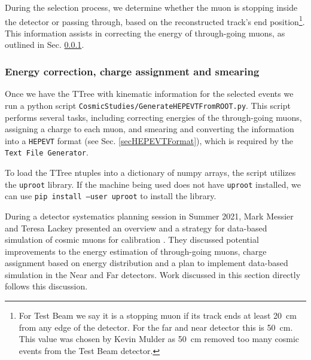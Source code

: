 During the selection process, we determine whether the muon is stopping inside the detector or passing through, based on the reconstructed track's end position\footnote{For Test Beam we say it is a stopping muon if its track ends at least 20~cm from any edge of the detector. For the far and near detector this is 50~cm. This value was chosen by Kevin Mulder \cite{NOVA-doc-39244-v1} as 50~cm removed too many cosmic events from the Test Beam detector.}. This information assists in correcting the energy of through-going muons, as outlined in Sec. \ref{secPython}.

\FloatBarrier
\subsubsection{Energy correction, charge assignment and smearing}\label{secPython}
Once we have the TTree with kinematic information for the selected events we run a python script \texttt{CosmicStudies/GenerateHEPEVTFromROOT.py}. This script performs several tasks, including correcting energies of the through-going muons, assigning a charge to each muon, and smearing and converting the information into a \texttt{HEPEVT} format (see Sec. \ref{secHEPEVTFormat}), which is required by the \texttt{Text File Generator}.

To load the TTree ntuples into a dictionary of numpy arrays, the script utilizes the \texttt{uproot} library. If the machine being used does not have \texttt{uproot} installed, we can use \texttt{pip install --user uproot} to install the library.

During a detector systematics planning session in Summer 2021, Mark Messier and Teresa Lackey presented an overview and a strategy for data-based simulation of cosmic muons for calibration \cite{NOVA-doc-51327-v3}. They discussed potential improvements to the energy estimation of through-going muons, charge assignment based on energy distribution and a plan to implement data-based simulation in the Near and Far detectors. Work discussed in this section directly follows this discussion.

